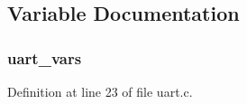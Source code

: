\subsection{Variable Documentation}
\subsubsection[{\texorpdfstring{uart\+\_\+vars}{uart_vars}}]{ uart\+\_\+vars}\hypertarget{ez430-rf2500_2uart_8c_a7ad63ce38b958040884df8d8ca5da620}{}\label{ez430-rf2500_2uart_8c_a7ad63ce38b958040884df8d8ca5da620}


Definition at line 23 of file uart.\+c.

